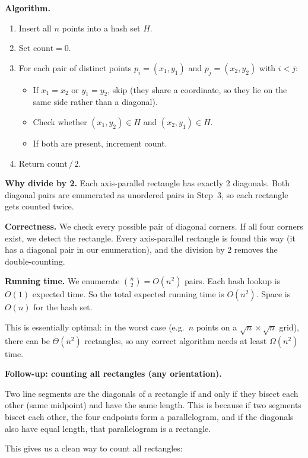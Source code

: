 \documentclass[10pt]{article}
\begin{document}
\textbf{Algorithm.}
\begin{enumerate}
\item Insert all $n$ points into a hash set $H$.
\item Set $\text{count} = 0$.
\item For each pair of distinct points $p_i = (x_1, y_1)$ and $p_j = (x_2, y_2)$ with $i < j$:
\begin{itemize}
    \item If $x_1 = x_2$ or $y_1 = y_2$, skip (they share a coordinate, so they lie on the same side rather than a diagonal).
    \item Check whether $(x_1, y_2) \in H$ and $(x_2, y_1) \in H$.
    \item If both are present, increment count.
\end{itemize}
\item Return $\text{count}\, / \, 2$.
\end{enumerate}

\textbf{Why divide by 2.}  Each axis-parallel rectangle has exactly 2 diagonals.  Both diagonal pairs are enumerated as unordered pairs in Step~3, so each rectangle gets counted twice.

\textbf{Correctness.}  We check every possible pair of diagonal corners.  If all four corners exist, we detect the rectangle.  Every axis-parallel rectangle is found this way (it has a diagonal pair in our enumeration), and the division by 2 removes the double-counting.

\textbf{Running time.}  We enumerate $\binom{n}{2} = O(n^2)$ pairs.  Each hash lookup is $O(1)$ expected time.  So the total expected running time is $O(n^2)$.  Space is $O(n)$ for the hash set.

This is essentially optimal: in the worst case (e.g.\ $n$ points on a $\sqrt{n} \times \sqrt{n}$ grid), there can be $\Theta(n^2)$ rectangles, so any correct algorithm needs at least $\Omega(n^2)$ time.

\bigskip
\textbf{Follow-up: counting all rectangles (any orientation).}

Two line segments are the diagonals of a rectangle if and only if they bisect each other (same midpoint) and have the same length.  This is because if two segments bisect each other, the four endpoints form a parallelogram, and if the diagonals also have equal length, that parallelogram is a rectangle.

This gives us a clean way to count all rectangles:
\end{document}
